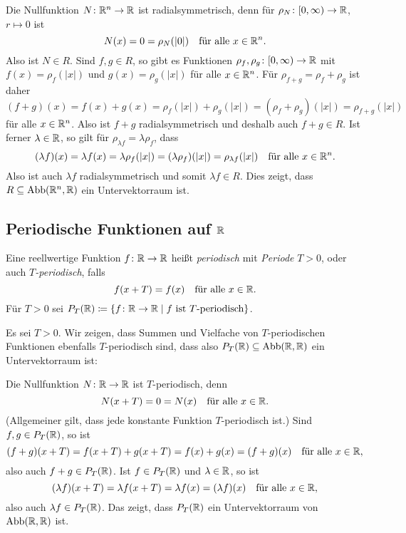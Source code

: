 Die Nullfunktion $N \colon \mathbb{R}^n \to \mathbb{R}$ ist radialsymmetrisch, denn für $\rho_N \colon [0,\infty) \to \mathbb{R}$, $r \mapsto 0$ ist
\[
 N(x) = 0 = \rho_N(|0|)
 \quad
 \text{für alle $x \in \mathbb{R}^n$}.
\]
Also ist $N \in R$. Sind $f,g \in R$, so gibt es Funktionen $\rho_f, \rho_g \colon [0,\infty) \to \mathbb{R}$ mit $f(x) = \rho_f(|x|)$ und $g(x) = \rho_g(|x|)$ für alle $x \in \mathbb{R}^n$. Für $\rho_{f+g} = \rho_f + \rho_g$ ist daher
\[
 (f+g)(x)
 = f(x) + g(x)
 = \rho_f(|x|) + \rho_g(|x|)
 = (\rho_f + \rho_g)(|x|)
 = \rho_{f+g}(|x|)
\]
für alle $x \in \mathbb{R}^n$. Also ist $f+g$ radialsymmetrisch und deshalb auch $f+g \in R$. Ist ferner $\lambda \in \mathbb{R}$, so gilt für $\rho_{\lambda f} = \lambda \rho_f$, dass
\[
 (\lambda f)(x)
 = \lambda f(x)
 = \lambda \rho_f(|x|)
 = (\lambda \rho_f)(|x|)
 = \rho_{\lambda f}(|x|)
 \quad
 \text{für alle $x \in \mathbb{R}^n$}.
\]
Also ist auch $\lambda f$ radialsymmetrisch und somit $\lambda f \in R$. Dies zeigt, dass \mbox{$R \subseteq \mathrm{Abb}(\mathbb{R}^n, \mathbb{R})$} ein Untervektorraum ist.



\subsection{Periodische Funktionen auf \texorpdfstring{$\mathbb{R}$}{R}}
\begin{defi}
 Eine reellwertige Funktion $f \colon \mathbb{R} \to \mathbb{R}$ heißt \emph{periodisch} mit \emph{Periode} $T >  0$, oder auch \emph{$T$-periodisch}, falls
 \[
  f(x+T) = f(x)
  \quad
  \text{für alle $x \in \mathbb{R}$}.
 \]
 Für $T > 0$ sei $P_T(\mathbb{R}) \coloneqq \{f \colon \mathbb{R} \to \mathbb{R} \mid \text{$f$ ist $T$-periodisch}\}$.
\end{defi}

Es sei $T > 0$. Wir zeigen, dass Summen und Vielfache von $T$-periodischen Funktionen ebenfalls $T$-periodisch sind, dass also $P_T(\mathbb{R}) \subseteq \mathrm{Abb}(\mathbb{R},\mathbb{R})$ ein Untervektorraum ist:

Die Nullfunktion $N \colon \mathbb{R} \to \mathbb{R}$ ist $T$-periodisch, denn
\[
 N(x+T) = 0 = N(x)
 \quad
 \text{für alle $x \in \mathbb{R}$}.
\]
(Allgemeiner gilt, dass jede konstante Funktion $T$-periodisch ist.) Sind $f,g \in P_T(\mathbb{R})$, so ist
\[
 (f+g)(x+T) = f(x+T) + g(x+T) = f(x) + g(x) = (f+g)(x)
 \quad
 \text{für alle $x \in \mathbb{R}$},
\]
also auch $f+g \in P_T(\mathbb{R})$. Ist $f \in P_T(\mathbb{R})$ und $\lambda \in \mathbb{R}$, so ist
\[
 (\lambda f)(x+T)
 = \lambda f(x+T)
 = \lambda f(x)
 = (\lambda f)(x)
 \quad
 \text{für alle $x \in \mathbb{R}$},
\]
also auch $\lambda f \in P_T(\mathbb{R})$. Das zeigt, dass $P_T(\mathbb{R})$ ein Untervektorraum von $\mathrm{Abb}(\mathbb{R},\mathbb{R})$ ist.

